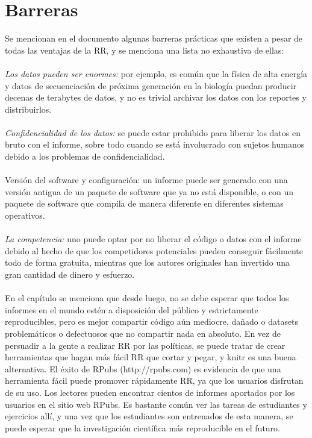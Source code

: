 \documentclass[conference]{IEEEtran}
\begin{document}
\section{Barreras}
Se mencionan en el documento algunas barreras prácticas que existen a pesar de todas las ventajas de la RR, y se menciona una lista no exhaustiva de ellas:\\\\
\textit{Los datos pueden ser enormes:} por ejemplo, es común que la física de alta energía y datos de secuenciación de próxima generación en la biología puedan producir decenas de terabytes de datos, y no es trivial archivar los datos con los reportes y distribuirlos.\\\\
\textit{Confidencialidad de los datos:} se puede estar prohibido para liberar los datos en bruto con el informe, sobre todo cuando se está involucrado con sujetos humanos debido a los problemas de confidencialidad.\\\\
Versión del software y configuración: un informe puede ser generado con una versión antigua de un paquete de software que ya no está disponible, o con un paquete de software que compila de manera diferente en diferentes sistemas operativos.\\\\
\textit{La competencia:} uno puede optar por no liberar el código o datos con el informe debido al hecho de que los competidores potenciales pueden conseguir fácilmente todo de forma gratuita, mientras que los autores originales han invertido una gran cantidad de dinero y esfuerzo.\\\\
En el capítulo se menciona que desde luego, no se debe esperar que todos los informes en el mundo estén a disposición del público y estrictamente reproducibles, pero es mejor compartir código aún mediocre, dañado o datasets problemáticos o defectuosos que no compartir nada en absoluto. En vez de persuadir a la gente a realizar RR por las políticas, se puede tratar de crear herramientas que hagan más fácil RR que cortar y pegar, y knitr es una buena alternativa. El éxito de RPubs (http://rpubs.com) es evidencia de que una herramienta fácil puede promover rápidamente RR, ya que los usuarios disfrutan de su uso. Los lectores pueden encontrar cientos de informes aportados por los usuarios en el sitio web RPubs. Es bastante común ver las tareas de estudiantes y ejercicios allí, y una vez que los estudiantes son entrenados de esta manera, se puede esperar que la investigación científica más reproducible en el futuro.
\end{document}
